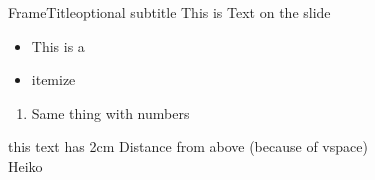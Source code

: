  
\begin{frame}[plain]{FrameTitle}{optional subtitle}
	This is Text on the slide
	\begin{itemize}
		\item This is a 
		\item itemize
	\end{itemize}
	\begin{enumerate}
		\item Same thing with numbers
	\end{enumerate}
	\vspace{2cm}
	this text has 2cm Distance from above (because of vspace)\\ %
	Heiko
\end{frame}